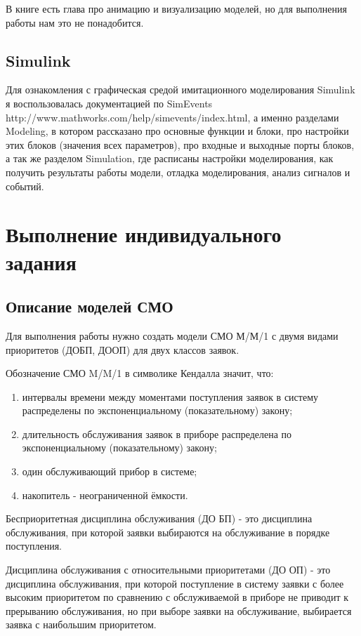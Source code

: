 \documentclass[a4paper,14pt]{report} %
\begin{document}
В книге есть глава про анимацию и визуализацию моделей, но для выполнения работы нам это не понадобится.
\section{Simulink}
Для ознакомления с графическая средой имитационного моделирования Simulink я воспользовалась документацией по SimEvents http://www.mathworks.com/help/simevents/index.html, а именно разделами Modeling, в котором рассказано про основные функции и блоки, про настройки этих блоков (значения всех параметров), про входные и выходные порты блоков, а так же разделом Simulation, где расписаны настройки моделирования, как получить результаты работы модели, отладка моделирования, анализ сигналов и событий.


\chapter{Выполнение индивидуального задания}
\section{Описание моделей СМО}
Для выполнения работы нужно создать модели СМО М/М/1 с двумя видами приоритетов (ДОБП, ДООП) для двух классов заявок. 

Обозначение СМО M/M/1  в символике Кендалла значит, что:
\begin{enumerate} %
\item интервалы времени между моментами поступления заявок в систему распределены по экспоненциальному (показательному) закону;
\item длительность обслуживания заявок в приборе распределена по экспоненциальному (показательному) закону;
\item один обслуживающий прибор в системе;
\item накопитель - неограниченной ёмкости.
\end{enumerate}

Бесприоритетная дисциплина обслуживания (ДО БП) - это дисциплина обслуживания, при которой заявки выбираются на обслуживание в порядке поступления.

Дисциплина обслуживания с относительными приоритетами (ДО ОП) - это дисциплина обслуживания, при которой поступление в систему заявки с более высоким приоритетом по сравнению с обслуживаемой в приборе не приводит к прерыванию обслуживания, но при выборе заявки на обслуживание, выбирается заявка с наибольшим приоритетом. 
\end{document}
